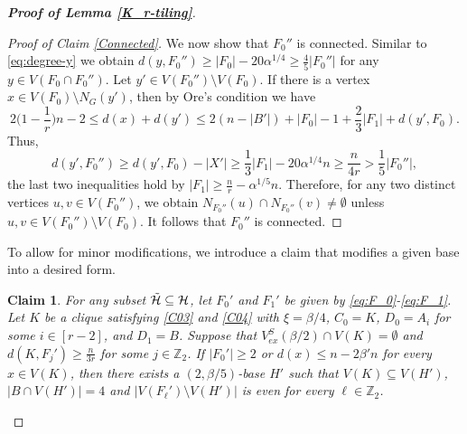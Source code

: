 \documentclass[11pt, a4paper]{article}
\newtheorem{claim}[theorem]{Claim}
\theoremstyle{definition}
\newcommand{\<}{\subseteq}
\begin{document}
\begin{proof}[\bf Proof of Lemma \ref{K_r-tiling}]
\begin{proof}[Proof of Claim \ref{Connected}]
   We now show that  $F_0''$ is connected. %
   Similar to \eqref{eq:degree-y} we obtain   $d(y,F_0'')\ge |F_0|-20\alpha^{1/4}\geq \frac{4}{5}|F_0''|$ for any $y \in V(F_0\cap F_0'')$. Let $y'\in V(F_0'')\setminus V(F_0)$. If there is a vertex $x\in V(F_0)\setminus N_G(y')$, then by Ore's condition we have
   $$
   2\Big(1-\frac{1}{r}\Big)n-2\leq d(x)+d(y')\leq 2(n-|B'|)+|F_0|-1+\frac{2}{3}|F_1|+d(y',F_0).
   $$
   Thus,
   $$
   d(y',F_0'')\geq d(y',F_0)-|X'|\geq \frac{1}{3}|F_1|-20\alpha^{1/4}n\geq \frac{n}{4r}>\frac{1}{5}|F_0''|,
$$
the last two  inequalities hold by $|F_1|\ge \frac{n}{r}-\alpha^{1/5} n$. Therefore, for any two distinct vertices $u,v\in V(F_0'')$, we obtain $N_{F_0''}(u)\cap N_{F_0''}(v)\neq \emptyset$ unless $u,v\in V(F_0'')\setminus V(F_0)$. It follows that $F_0''$ is connected. 
\end{proof}
To allow for minor modifications, we introduce a claim that modifies a given base into a desired form. 
\begin{claim}\label{Adjust}
{For any subset $\Tilde{\mathcal{H}}\subseteq \mathcal{H}$, let  $F_0'$ and $F_1'$ be given by \eqref{eq:F_0}-\eqref{eq:F_1}. Let $K$ be a clique satisfying \ref{C03} and \ref{C04} with $\xi=\beta/4$, $C_0=K$, $D_0=A_i$ for some $i\in [r-2]$,
and $D_1=B$. %
Suppose that $V_{ex}^S(\beta/2) \cap V(K)=\emptyset$ and $d(K,F_j')\ge \frac{n}{3r}$ for some $j\in \mathbb{Z}_2$. If $|F_0'|\ge 2$ or $d(x)\le n-2\beta'n$ for every $x\in V(K)$, then there exists a $(2,\beta/5)$-base $H'$ such that $V(K)\subseteq V(H')$, $|B\cap V(H')|=4$ and $|V(F_\ell')\setminus V(H')|$ is even for every $\ell\in \mathbb{Z}_2$. }

\end{claim}
\end{proof}
\end{document}
